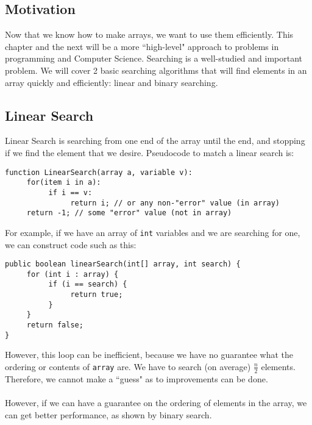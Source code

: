
\subsection{Motivation}
Now that we know how to make arrays, we want to use them efficiently. This chapter and the next will be a more ``high-level" approach to problems in programming and Computer Science. Searching is a well-studied and important problem. We will cover 2 basic searching algorithms that will find elements in an array quickly and efficiently: linear and binary searching.

\subsection{Linear Search}
Linear Search is searching from one end of the array until the end, and stopping if we find the element that we desire. Pseudocode to match a linear search is:
\begin{verbatim}
function LinearSearch(array a, variable v):
     for(item i in a):
          if i == v:
               return i; // or any non-"error" value (in array)
     return -1; // some "error" value (not in array)
\end{verbatim}
For example, if we have an array of \verb|int| variables and we are searching for one, we can construct code such as this:
\begin{lstlisting}
public boolean linearSearch(int[] array, int search) {
     for (int i : array) {
          if (i == search) {
               return true;
          }
     }
     return false;
}
\end{lstlisting}
However, this loop can be inefficient, because we have no guarantee what the ordering or contents of \verb|array| are. We have to search (on average) $\frac{n}{2}$ elements. Therefore, we cannot make a ``guess" as to improvements can be done.
\\ \\
However, if we can have a guarantee on the ordering of elements in the array, we can get better performance, as shown by binary search.

